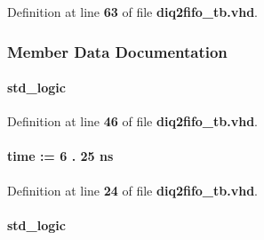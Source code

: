Definition at line {\bf 63} of file {\bf diq2fifo\+\_\+tb.\+vhd}.



\subsubsection{Member Data Documentation}
\paragraph[{clk0}]{ {\bfseries \textcolor{comment}{std\+\_\+logic}\textcolor{vhdlchar}{ }} \hspace{0.3cm}{\ttfamily [Signal]}}\label{classdiq2fifo__tb_1_1tb__behave_a693d72741b9413130fe2d67511b642be}


Definition at line {\bf 46} of file {\bf diq2fifo\+\_\+tb.\+vhd}.

\paragraph[{clk0\+\_\+period}]{ {\bfseries \textcolor{comment}{time}\textcolor{vhdlchar}{ }\textcolor{vhdlchar}{ }\textcolor{vhdlchar}{\+:}\textcolor{vhdlchar}{=}\textcolor{vhdlchar}{ }\textcolor{vhdlchar}{ }\textcolor{vhdlchar}{ } \textcolor{vhdldigit}{6} \textcolor{vhdlchar}{.} \textcolor{vhdldigit}{25} \textcolor{vhdlchar}{ }\textcolor{vhdlchar}{ns}\textcolor{vhdlchar}{ }} \hspace{0.3cm}{\ttfamily [Constant]}}\label{classdiq2fifo__tb_1_1tb__behave_aeff8690ce469b1a2355a25018cf547fb}


Definition at line {\bf 24} of file {\bf diq2fifo\+\_\+tb.\+vhd}.

\paragraph[{clk1}]{ {\bfseries \textcolor{comment}{std\+\_\+logic}\textcolor{vhdlchar}{ }} \hspace{0.3cm}{\ttfamily [Signal]}}\label{classdiq2fifo__tb_1_1tb__behave_ade95921e47b0e4d2d11e496794648550}


